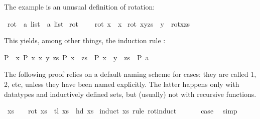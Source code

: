 \begin{isabellebody}
\begin{isamarkuptext}
The example is an unusual definition of rotation:%
\end{isamarkuptext}%
\isamarkuptrue%
\isamarkupfalse%
\ rot\ {\isacharcolon}{\isacharcolon}\ {\isachardoublequoteopen}{\isacharprime}a\ list\ {\isasymRightarrow}\ {\isacharprime}a\ list{\isachardoublequoteclose}\ \isanewline
{\isachardoublequoteopen}rot\ {\isacharbrackleft}{\isacharbrackright}\ {\isacharequal}\ {\isacharbrackleft}{\isacharbrackright}{\isachardoublequoteclose}\ {\isacharbar}\isanewline
{\isachardoublequoteopen}rot\ {\isacharbrackleft}x{\isacharbrackright}\ {\isacharequal}\ {\isacharbrackleft}x{\isacharbrackright}{\isachardoublequoteclose}\ {\isacharbar}\isanewline
{\isachardoublequoteopen}rot\ {\isacharparenleft}x{\isacharhash}y{\isacharhash}zs{\isacharparenright}\ {\isacharequal}\ y\ {\isacharhash}\ rot{\isacharparenleft}x{\isacharhash}zs{\isacharparenright}{\isachardoublequoteclose}%
\begin{isamarkuptext}%
\noindent This yields, among other things, the induction rule
: \begin{isabelle}%
{\isasymlbrakk}P\ {\isacharbrackleft}{\isacharbrackright}{\isacharsemicolon}\ {\isasymAnd}x{\isachardot}\ P\ {\isacharbrackleft}x{\isacharbrackright}{\isacharsemicolon}\ {\isasymAnd}x\ y\ zs{\isachardot}\ P\ {\isacharparenleft}x\ {\isacharhash}\ zs{\isacharparenright}\ {\isasymLongrightarrow}\ P\ {\isacharparenleft}x\ {\isacharhash}\ y\ {\isacharhash}\ zs{\isacharparenright}{\isasymrbrakk}\ {\isasymLongrightarrow}\ P\ a{}%
\end{isabelle}
The following proof relies on a default naming scheme for cases: they are
called 1, 2, etc, unless they have been named explicitly. The latter happens
only with datatypes and inductively defined sets, but (usually)
not with recursive functions.%
\end{isamarkuptext}%
\isamarkuptrue%
\isamarkupfalse%
\ {\isachardoublequoteopen}xs\ {\isasymnoteq}\ {\isacharbrackleft}{\isacharbrackright}\ {\isasymLongrightarrow}\ rot\ xs\ {\isacharequal}\ tl\ xs\ {\isacharat}\ {\isacharbrackleft}hd\ xs{\isacharbrackright}{\isachardoublequoteclose}\isanewline
%
\isadelimproof
%
\endisadelimproof
%
\isatagproof
{}\isamarkupfalse%
\ {\isacharparenleft}induct\ xs\ rule{\isacharcolon}\ rot{\isachardot}induct{\isacharparenright}\isanewline
\ \ \isamarkupfalse%
\ {}\ \isamarkupfalse%
\ {\isacharquery}case\ \isamarkupfalse%
\ simp\isanewline

\end{isabellebody}
